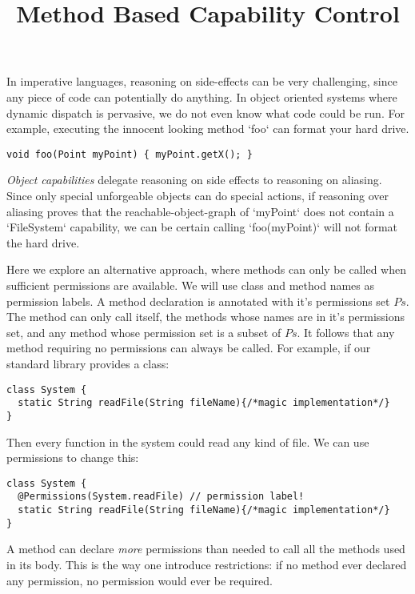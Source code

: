 \documentclass[a4paper,twoside,british,9pt]{extarticle}
\providecommand*{\code}[1]{\Q`#1`}
\begin{document}
\title{Method Based Capability Control}
\date{}
\maketitle
\vspace{-10ex}
In imperative languages, reasoning on side-effects can be very challenging,
since any piece of code can potentially do anything. In object oriented
systems where dynamic dispatch is pervasive, we do not even know what code
could be run. For example, executing the innocent looking method \code{foo}
can format your hard drive.
\vspace{-1ex}
\begin{lstlisting}
void foo(Point myPoint) { myPoint.getX(); }
\end{lstlisting}
\vspace{-1ex}
\emph{Object capabilities} delegate reasoning on side effects
to reasoning on aliasing. Since only special unforgeable objects can do
special actions, if reasoning over aliasing proves that the
reachable-object-graph of \code{myPoint} does not contain a \code{FileSystem}
capability, we can be certain calling \code{foo(myPoint)}
will not format the hard drive.

Here we explore an alternative approach, where methods can only be
called when sufficient permissions are available. 
We will use class and method names as permission labels.
A method declaration is annotated with it's permissions set $Ps$.
The method can only call itself, the methods whose names are in it's permissions set, 
and any method whose permission set is a subset of $Ps$. It follows that any method requiring no permissions can always be called.
For example, if our standard library
provides a class:
\vspace{-1ex}
\begin{lstlisting}
class System { 
  static String readFile(String fileName){/*magic implementation*/}
}
\end{lstlisting}
\vspace{-1ex}
Then every function in the system could read any kind of file. We
can use permissions to change this:
\vspace{-1ex}
\begin{lstlisting}
class System { 
  @Permissions(System.readFile) // permission label! 
  static String readFile(String fileName){/*magic implementation*/}
}
\end{lstlisting}
\vspace{-1ex}
A method can declare \textit{more} permissions than needed to call all the methods
used in its body.
This is the way one introduce restrictions: if no method ever declared any permission, no permission
would ever be required.
\end{document}
